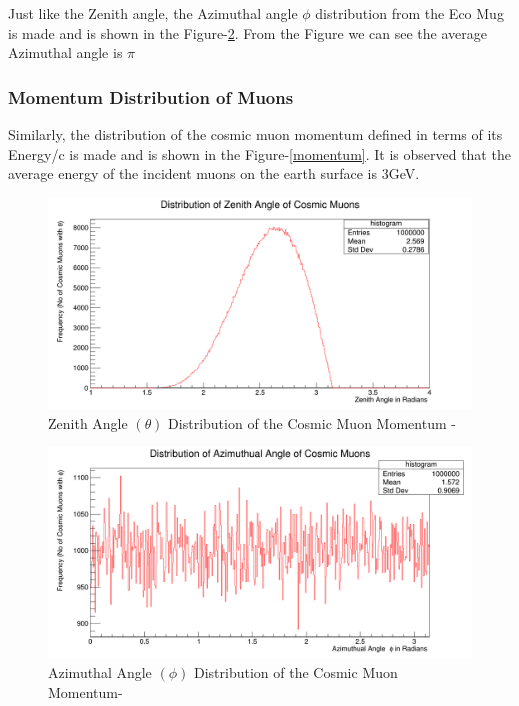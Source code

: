 \documentclass{article}
\begin{document}
\begin{multicols}{2}
Just like the Zenith angle, the Azimuthal angle $\phi$ distribution
from the Eco Mug is made and is shown in the Figure-\ref{azimuthal}.
From the Figure we can see the average Azimuthal angle is $\pi$



\subsubsection{Momentum Distribution of Muons}

Similarly, the distribution of the cosmic muon momentum defined in terms of its
Energy/c is made and is shown in the Figure-\ref{momentum}. It
is observed that the average energy of the incident muons on the earth
surface is 3GeV.





\begin{figure}[H]
    \centering	
     \includegraphics[width=\columnwidth]{zenith.png}
     \caption{Zenith Angle $(\theta)$ Distribution of the Cosmic Muon Momentum -\cite{ROOT}\cite{python}}
     \label{zenith}
\end{figure}


\begin{figure}[H]
    \centering	
     \includegraphics[width=\columnwidth]{azimuthual.png}
     \caption{Azimuthal Angle $(\phi)$ Distribution of the Cosmic Muon Momentum-\cite{ROOT}\cite{python}}
     \label{azimuthal}
\end{figure}


\end{multicols}
\end{document}
